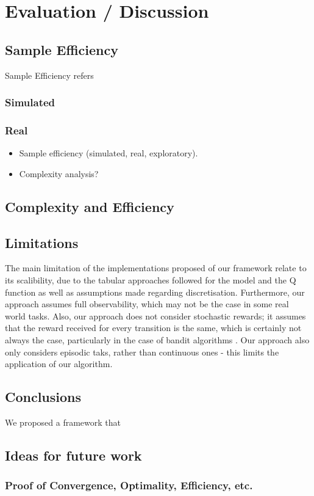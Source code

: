 \chapter{Evaluation / Discussion}
\label{chapter6}
\section{Sample Efficiency}
Sample Efficiency refers 
\subsection{Simulated}
\subsection{Real}
\begin{itemize}
    \item Sample efficiency (simulated, real, exploratory).
    \item Complexity analysis?
\end{itemize}
\section{Complexity and Efficiency}
\section{Limitations}
The main limitation of the implementations proposed of our framework relate to its scalibility, due to the tabular approaches followed for the model and the Q function as well as assumptions made regarding discretisation. Furthermore, our approach assumes full observability, which may not be the case in some real world tasks. Also, our approach does not consider stochastic rewards; it assumes that the reward received for every transition is the same, which is certainly not always the case, particularly in the case of bandit algorithms \citep{lattimore}. Our approach also only considers episodic taks, rather than continuous ones - this limits the application of our algorithm.
\section{Conclusions}
We proposed a framework that 
\section{Ideas for future work}

\subsection{Proof of Convergence, Optimality, Efficiency, etc.}

